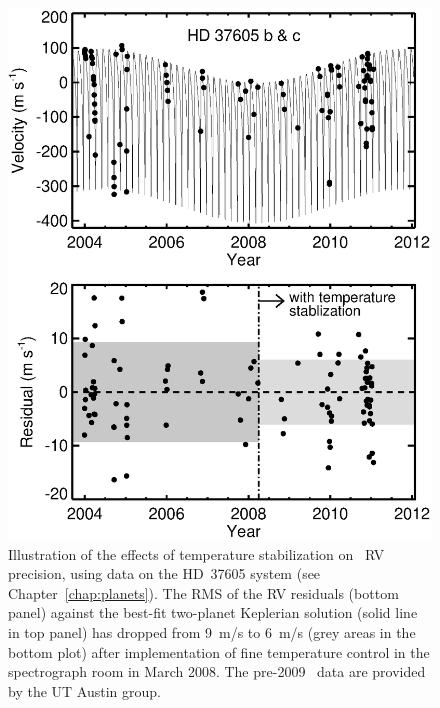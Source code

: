 \begin{figure}
\centering
\includegraphics[scale=0.5]{het/37605.eps}
\caption{Illustration of the effects of temperature stabilization on
  \het\ RV precision, using data on the HD~37605 system (see
  Chapter~\ref{chap:planets}). The RMS of the RV residuals (bottom
  panel) against the best-fit two-planet Keplerian solution (solid
  line in top panel) has dropped from 9~m/s to 6~m/s (grey areas in
  the bottom plot) after implementation of fine temperature control in
  the spectrograph room in March 2008. The pre-2009 \het\ data are
  provided by the UT Austin group.
\label{het:fig:tempstable}}
\end{figure}


